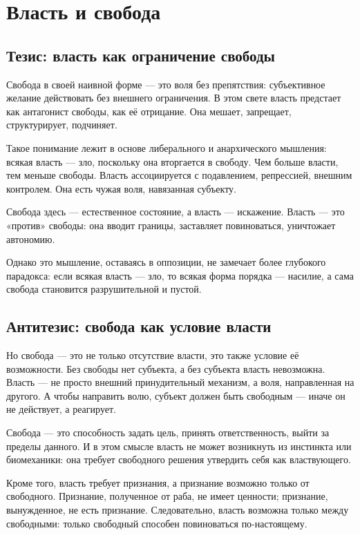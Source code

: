 \chapter{Власть и свобода}

\section{Тезис: власть как ограничение свободы}

Свобода в своей наивной форме — это воля без препятствия: субъективное желание действовать без внешнего ограничения. В этом свете власть предстает как антагонист свободы, как её отрицание. Она мешает, запрещает, структурирует, подчиняет.

Такое понимание лежит в основе либерального и анархического мышления: всякая власть — зло, поскольку она вторгается в свободу. Чем больше власти, тем меньше свободы. Власть ассоциируется с подавлением, репрессией, внешним контролем. Она есть чужая воля, навязанная субъекту.

Свобода здесь — естественное состояние, а власть — искажение. Власть — это «против» свободы: она вводит границы, заставляет повиноваться, уничтожает автономию.

Однако это мышление, оставаясь в оппозиции, не замечает более глубокого парадокса: если всякая власть — зло, то всякая форма порядка — насилие, а сама свобода становится разрушительной и пустой.


\section{Антитезис: свобода как условие власти}

Но свобода — это не только отсутствие власти, это также условие её возможности. Без свободы нет субъекта, а без субъекта власть невозможна. Власть — не просто внешний принудительный механизм, а воля, направленная на другого. А чтобы направить волю, субъект должен быть свободным — иначе он не действует, а реагирует.

Свобода — это способность задать цель, принять ответственность, выйти за пределы данного. И в этом смысле власть не может возникнуть из инстинкта или биомеханики: она требует свободного решения утвердить себя как властвующего.

Кроме того, власть требует признания, а признание возможно только от свободного. Признание, полученное от раба, не имеет ценности; признание, вынужденное, не есть признание. Следовательно, власть возможна только между свободными: только свободный способен повиноваться по-настоящему.

